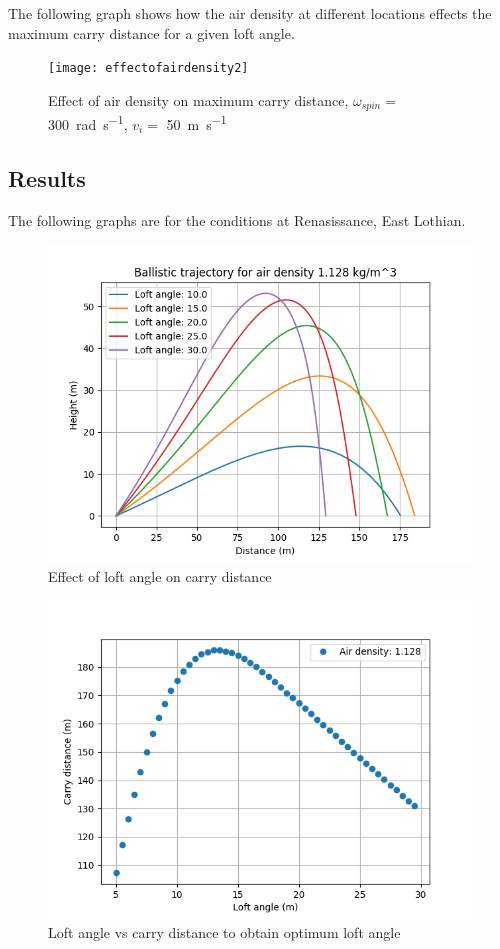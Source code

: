 \documentclass[12pt]{article}
\begin{document}
The following graph shows how the air density at different locations effects the maximum carry distance for a given loft angle. 
\begin{figure}[H]
\centering
\caption{Effect of air density on maximum carry distance, $\omega_{spin}=$ \SI{300}{\radian\per\second}, $v_i =$ \SI{50}{\metre\per\second}}
\texttt{[image: effectofairdensity2]}
\end{figure}


\subsection{Results}
The following graphs are for the conditions at Renasissance, East Lothian.

\begin{figure}[H]
\centering
\caption{Effect of loft angle on carry distance}
\includegraphics[scale=0.6]{results1128}
\end{figure}

\begin{figure}[H]
\centering
\caption{Loft angle vs carry distance to obtain optimum loft angle}
\includegraphics[scale=0.6]{results1128range}
\end{figure}
\end{document}
